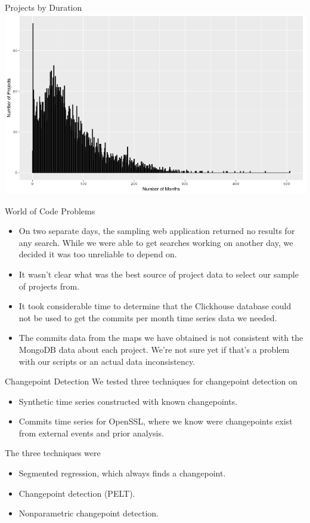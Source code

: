 \documentclass[11pt,handout]{beamer}
\begin{document}
\begin{frame}{Projects by Duration}
    \includegraphics[width=\textwidth,keepaspectratio]{project-durations.png}
\end{frame}

\begin{frame}{World of Code Problems}
\begin{itemize}
    \item On two separate days, the sampling web application returned no results for any search. While we were able to get searches working on another day, we decided it was too unreliable to depend on.    
    \item It wasn't clear what was the best source of project data to select our sample of projects from.
    \item It took considerable time to determine that the Clickhouse database could not be used to get the commits per month time series data we needed.
    \item The commits data from the maps we have obtained is not consistent with the MongoDB data about each project. We're not sure yet if that's a problem with our scripts or an actual data inconsistency.
\end{itemize}
\end{frame}

\begin{frame}{Changepoint Detection}
We tested three techniques for changepoint detection on 
    \begin{itemize}
        \item Synthetic time series constructed with known changepoints.
        \item Commits time series for OpenSSL, where we know were changepoints exist from external events and prior analysis.
    \end{itemize}
The three techniques were
    \begin{itemize}
        \item Segmented regression, which always finds a changepoint.
        \item Changepoint detection (PELT).
        \item Nonparametric changepoint detection.
    \end{itemize}
\end{frame}
\end{document}

